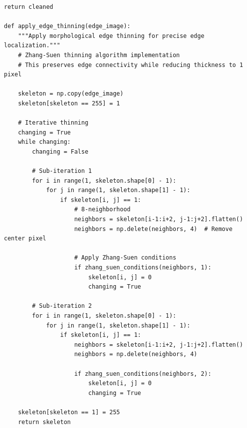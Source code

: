 \documentclass[conference]{IEEEtran}
\begin{document}
\begin{lstlisting}[caption={Multi-scale noise reduction with edge preservation}]
    return cleaned

def apply_edge_thinning(edge_image):
    """Apply morphological edge thinning for precise edge localization."""
    # Zhang-Suen thinning algorithm implementation
    # This preserves edge connectivity while reducing thickness to 1 pixel
    
    skeleton = np.copy(edge_image)
    skeleton[skeleton == 255] = 1
    
    # Iterative thinning
    changing = True
    while changing:
        changing = False
        
        # Sub-iteration 1
        for i in range(1, skeleton.shape[0] - 1):
            for j in range(1, skeleton.shape[1] - 1):
                if skeleton[i, j] == 1:
                    # 8-neighborhood
                    neighbors = skeleton[i-1:i+2, j-1:j+2].flatten()
                    neighbors = np.delete(neighbors, 4)  # Remove center pixel
                    
                    # Apply Zhang-Suen conditions
                    if zhang_suen_conditions(neighbors, 1):
                        skeleton[i, j] = 0
                        changing = True
        
        # Sub-iteration 2
        for i in range(1, skeleton.shape[0] - 1):
            for j in range(1, skeleton.shape[1] - 1):
                if skeleton[i, j] == 1:
                    neighbors = skeleton[i-1:i+2, j-1:j+2].flatten()
                    neighbors = np.delete(neighbors, 4)
                    
                    if zhang_suen_conditions(neighbors, 2):
                        skeleton[i, j] = 0
                        changing = True
    
    skeleton[skeleton == 1] = 255
    return skeleton
\end{lstlisting}
\end{document}
